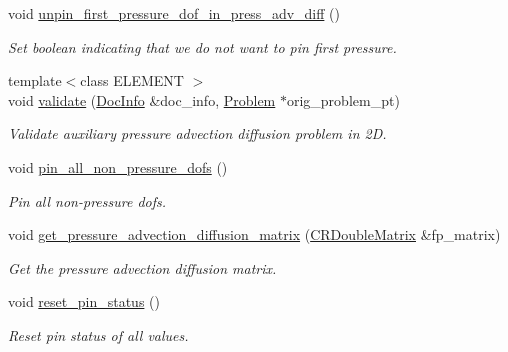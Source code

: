 \begin{DoxyCompactItemize}
void \hyperlink{classoomph_1_1NavierStokesSchurComplementPreconditioner_a58c02e402f5c6103268da36097b4ad0e}{unpin\+\_\+first\+\_\+pressure\+\_\+dof\+\_\+in\+\_\+press\+\_\+adv\+\_\+diff} ()
\begin{DoxyCompactList}\small\item\em Set boolean indicating that we do not want to pin first pressure. \end{DoxyCompactList}\item 
{\footnotesize template$<$class E\+L\+E\+M\+E\+NT $>$ }\\void \hyperlink{classoomph_1_1NavierStokesSchurComplementPreconditioner_a1b42174c40c4fec1336c547aaa3d07f5}{validate} (\hyperlink{classoomph_1_1DocInfo}{Doc\+Info} \&doc\+\_\+info, \hyperlink{classoomph_1_1Problem}{Problem} $\ast$orig\+\_\+problem\+\_\+pt)
\begin{DoxyCompactList}\small\item\em Validate auxiliary pressure advection diffusion problem in 2D. \end{DoxyCompactList}\item 
void \hyperlink{classoomph_1_1NavierStokesSchurComplementPreconditioner_a03941c01d70ece07797301c8ac6a0a8a}{pin\+\_\+all\+\_\+non\+\_\+pressure\+\_\+dofs} ()
\begin{DoxyCompactList}\small\item\em Pin all non-\/pressure dofs. \end{DoxyCompactList}\item 
void \hyperlink{classoomph_1_1NavierStokesSchurComplementPreconditioner_ac3f40f62d33d33616cdb4bed48aaccde}{get\+\_\+pressure\+\_\+advection\+\_\+diffusion\+\_\+matrix} (\hyperlink{classoomph_1_1CRDoubleMatrix}{C\+R\+Double\+Matrix} \&fp\+\_\+matrix)
\begin{DoxyCompactList}\small\item\em Get the pressure advection diffusion matrix. \end{DoxyCompactList}\item 
void \hyperlink{classoomph_1_1NavierStokesSchurComplementPreconditioner_af1c121b668b1961a68010f984166947c}{reset\+\_\+pin\+\_\+status} ()
\begin{DoxyCompactList}\small\item\em Reset pin status of all values. \end{DoxyCompactList}\end{DoxyCompactItemize}
